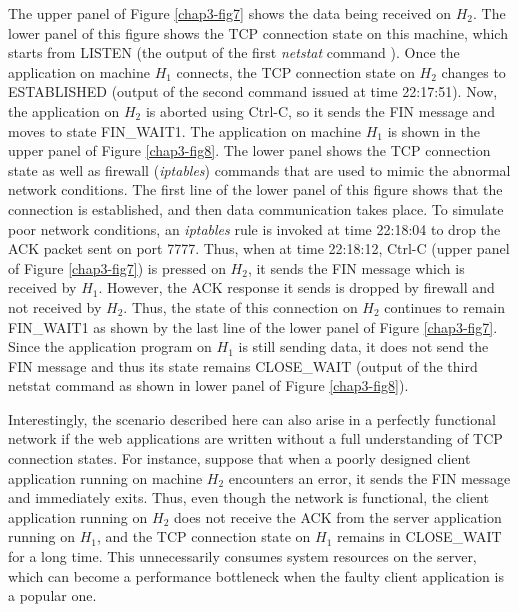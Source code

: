 \begin{multicols}{2}
The upper panel of Figure \ref{chap3-fig7} shows the data being received on $H_{2}$. The lower panel of this figure shows the TCP connection state on this machine, which starts from LISTEN (the output of the first \textit{netstat} command \cite{chap3-key3}\cite{chap3-key4}). Once the application on machine $H_{1}$ connects, the TCP connection state on $H_{2}$ changes to ESTABLISHED (output of the second command issued at time 22:17:51). Now, the application on $H_{2}$ is aborted using Ctrl-C, so it sends the FIN message and moves to state FIN\_WAIT1. The application on machine $H_{1}$ is shown in the upper panel of  Figure \ref{chap3-fig8}. The lower panel shows the TCP connection state as well as firewall (\textit{iptables}) commands that are used to mimic the abnormal network conditions. The first line of the lower panel of this figure shows that the connection is established, and then data communication takes place. To simulate poor network conditions, an \textit{iptables} rule is invoked at time 22:18:04 to drop the ACK packet sent on port 7777. Thus, when at time 22:18:12, Ctrl-C (upper panel of Figure \ref{chap3-fig7}) is pressed on $H_{2}$, it sends the FIN message which is received by $H_{1}$. However, the ACK response it sends is dropped by firewall and not received by $H_{2}$. Thus, the state of this connection on $H_{2}$ continues to remain FIN\_WAIT1 as shown by the last line of the lower panel of Figure \ref{chap3-fig7}. Since the application program on $H_{1}$ is still sending data, it does not send the FIN message and thus its state remains CLOSE\_WAIT (output of the third netstat command as shown in lower panel of Figure \ref{chap3-fig8}).


Interestingly, the scenario described here can also arise in a perfectly functional network if the web applications are written without a full understanding of TCP connection states. For instance, suppose that when a poorly designed client application running on machine $H_{2}$ encounters an error, it sends the FIN message and immediately exits. Thus, even though the network is functional, the client application running on $H_{2}$ does not receive the ACK from the server application running on $H_{1}$, and the TCP connection state on $H_{1}$ remains in CLOSE\_WAIT for a long time. This unnecessarily consumes system resources on the server, which can become a performance bottleneck when the faulty client application is a popular one.

\newpage


\end{multicols}
